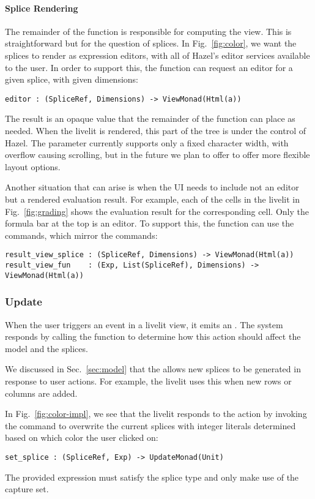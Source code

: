 \paragraph{Splice Rendering}
The remainder of the  function is responsible for computing the view.
This is straightforward but for the question of splices. In Fig.~\ref{fig:color},
we want the splices to render as expression editors, with all of Hazel's editor 
services available to the user. In order to support this, the  function
can request an editor for a given splice, with given dimensions:
\begin{lstlisting}[numbers=none]
editor : (SpliceRef, Dimensions) -> ViewMonad(Html(a))
\end{lstlisting}
The result is an opaque  value that the remainder of the function 
can place as needed. When the livelit is rendered, this part of the tree is 
under the control of Hazel. The  parameter currently supports only a fixed
character width, with overflow causing scrolling, but in the future we plan to offer 
to offer more flexible layout options.

Another situation that can arise is when the UI needs to include not an editor but 
a rendered evaluation result. For example, each of the cells in the 
livelit in Fig.~\ref{fig:grading} shows the evaluation result for the corresponding 
cell. Only the formula bar at the top is an editor. To support this, the 
function can use the  commands, which mirror the  commands:
\begin{lstlisting}[numbers=none]
result_view_splice : (SpliceRef, Dimensions) -> ViewMonad(Html(a))
result_view_fun    : (Exp, List(SpliceRef), Dimensions) -> ViewMonad(Html(a))
\end{lstlisting}


\subsubsection{Update}
When the user triggers an event in a livelit view, it emits an .
The system responds by calling the  function to determine how 
this action should affect the model and the splices. 

We discussed in Sec.~\ref{sec:model} that the 
allows new splices to be generated in response to user actions. 
For example, the  livelit uses this when new rows
or columns are added.

In Fig.~\ref{fig:color-impl}, we see that the  livelit responds to 
the  action by invoking the  command to overwrite 
the current splices with integer literals determined based on which color the user
clicked on:
\begin{lstlisting}[numbers=none]
  set_splice : (SpliceRef, Exp) -> UpdateMonad(Unit)
\end{lstlisting}
The provided expression must satisfy the splice type and only make use of the capture set.


